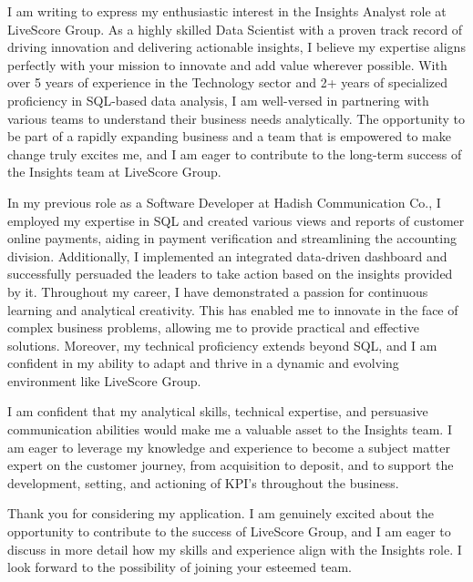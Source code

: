 \documentclass[../main.tex]{subfiles}
\begin{document}
\begin{cvletter}



\makelettertitle

I am writing to express my enthusiastic interest in the Insights Analyst role at LiveScore Group\texttrademark. As a highly skilled Data Scientist with a proven track record of driving innovation and delivering actionable insights, I believe my expertise aligns perfectly with your mission to innovate and add value wherever possible.
With over 5 years of experience in the Technology sector and 2+ years of specialized proficiency in SQL-based data analysis, I am well-versed in partnering with various teams to understand their business needs analytically. The opportunity to be part of a rapidly expanding business and a team that is empowered to make change truly excites me, and I am eager to contribute to the long-term success of the Insights team at LiveScore Group\texttrademark.

In my previous role as a Software Developer at Hadish Communication Co., I employed my expertise in SQL and created various views and reports of customer online payments, aiding in payment verification and streamlining the accounting division. Additionally, I implemented an integrated data-driven dashboard and successfully persuaded the leaders to take action based on the insights provided by it.
Throughout my career, I have demonstrated a passion for continuous learning and analytical creativity. This has enabled me to innovate in the face of complex business problems, allowing me to provide practical and effective solutions. Moreover, my technical proficiency extends beyond SQL, and I am confident in my ability to adapt and thrive in a dynamic and evolving environment like LiveScore Group\texttrademark.

I am confident that my analytical skills, technical expertise, and persuasive communication abilities would make me a valuable asset to the Insights team. I am eager to leverage my knowledge and experience to become a subject matter expert on the customer journey, from acquisition to deposit, and to support the development, setting, and actioning of KPI's throughout the business.

Thank you for considering my application. I am genuinely excited about the opportunity to contribute to the success of LiveScore Group\texttrademark, and I am eager to discuss in more detail how my skills and experience align with the Insights role. I look forward to the possibility of joining your esteemed team.

\makeletterclosing
\end{cvletter}
\end{document}
